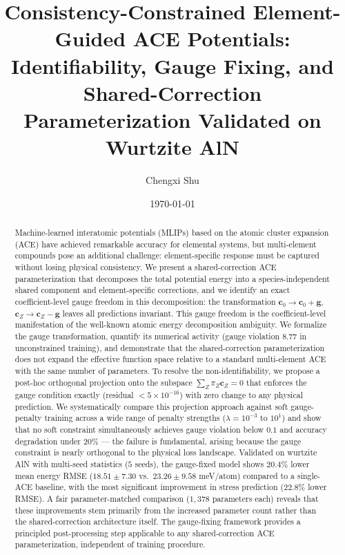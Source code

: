 \documentclass[twoside,prb,aps,floatfix,superscriptaddress,longbibliography]{revtex4-2}
\begin{document}
\title{Consistency-Constrained Element-Guided ACE Potentials: \\
Identifiability, Gauge Fixing, and Shared-Correction \\
Parameterization Validated on Wurtzite AlN}

\author{Chengxi Shu}

\date{\today}

\begin{abstract}
Machine-learned interatomic potentials (MLIPs) based on the atomic cluster expansion (ACE) have achieved remarkable accuracy for elemental systems, but multi-element compounds pose an additional challenge: element-specific response must be captured without losing physical consistency. We present a shared-correction ACE parameterization that decomposes the total potential energy into a species-independent shared component and element-specific corrections, and we identify an exact coefficient-level gauge freedom in this decomposition: the transformation $\mathbf{c}_0 \to \mathbf{c}_0 + \mathbf{g}$, $\mathbf{c}_Z \to \mathbf{c}_Z - \mathbf{g}$ leaves all predictions invariant. This gauge freedom is the coefficient-level manifestation of the well-known atomic energy decomposition ambiguity. We formalize the gauge transformation, quantify its numerical activity (gauge violation $8.77$ in unconstrained training), and demonstrate that the shared-correction parameterization does not expand the effective function space relative to a standard multi-element ACE with the same number of parameters. To resolve the non-identifiability, we propose a post-hoc orthogonal projection onto the subspace $\sum_Z \pi_Z \mathbf{c}_Z = 0$ that enforces the gauge condition exactly (residual $< 5\times10^{-16}$) with zero change to any physical prediction. We systematically compare this projection approach against soft gauge-penalty training across a wide range of penalty strengths ($\lambda = 10^{-3}$ to $10^1$) and show that no soft constraint simultaneously achieves gauge violation below $0.1$ and accuracy degradation under $20\%$ --- the failure is fundamental, arising because the gauge constraint is nearly orthogonal to the physical loss landscape. Validated on wurtzite AlN with multi-seed statistics ($5$ seeds), the gauge-fixed model shows $20.4\%$ lower mean energy RMSE ($18.51 \pm 7.30$ vs.\ $23.26 \pm 9.58$ meV/atom) compared to a single-ACE baseline, with the most significant improvement in stress prediction ($22.8\%$ lower RMSE). A fair parameter-matched comparison ($1{,}378$ parameters each) reveals that these improvements stem primarily from the increased parameter count rather than the shared-correction architecture itself. The gauge-fixing framework provides a principled post-processing step applicable to any shared-correction ACE parameterization, independent of training procedure.
\end{abstract}
\end{document}
